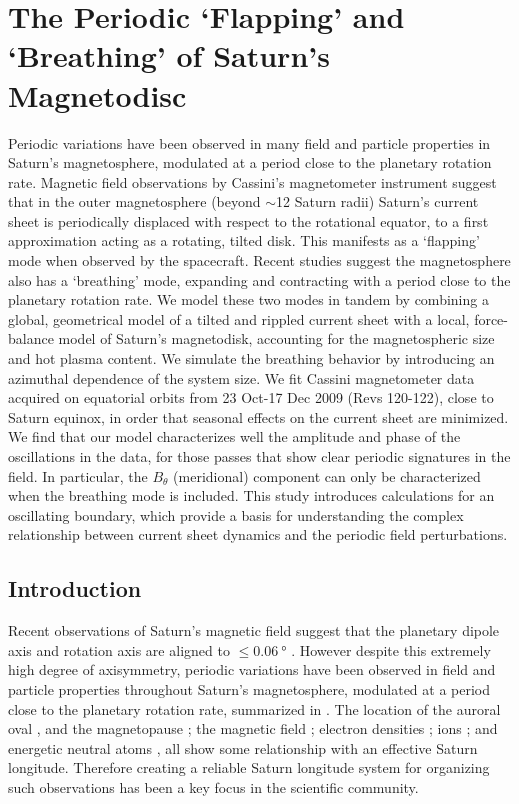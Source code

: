 \chapter[The Periodic Flapping and Breathing of Saturn's Magnetodisc]{The Periodic `Flapping' and `Breathing' of Saturn's Magnetodisc}
\label{chap:equinox}

Periodic variations have been observed in many field and particle properties in Saturn's magnetosphere, modulated at a period close to the planetary rotation rate. Magnetic field observations by Cassini's magnetometer instrument suggest that in the outer magnetosphere (beyond ${\sim}$12 Saturn radii) Saturn's current sheet is periodically displaced with respect to the rotational equator, to a first approximation acting as a rotating, tilted disk. This manifests as a `flapping' mode when observed by the spacecraft. Recent studies suggest the magnetosphere also has a `breathing' mode, expanding and contracting with a period close to the planetary rotation rate. We model these two modes in tandem by combining a global, geometrical model of a tilted and rippled current sheet with a local, force-balance model of Saturn's magnetodisk, accounting for the magnetospheric size and hot plasma content. We simulate the breathing behavior by introducing an azimuthal dependence of the system size. We fit Cassini magnetometer data acquired on equatorial orbits from 23 Oct{\--}17 Dec 2009 (Revs 120{\--}122), close to Saturn equinox, in order that seasonal effects on the current sheet are minimized. We find that our model characterizes well the amplitude and phase of the oscillations in the data, for those passes that show clear periodic signatures in the field. In particular, the $B_\theta$ (meridional) component can only be characterized when the breathing mode is included. This study introduces calculations for an oscillating boundary, which provide a basis for understanding the complex relationship between current sheet dynamics and the periodic field perturbations.

\section{Introduction}\label{equinox:sec:intro}
Recent observations of Saturn's magnetic field suggest that the planetary dipole axis and rotation axis are aligned to $\leq\SI{0.06}{\degree}$ \citep{cao2011}. However despite this extremely high degree of axisymmetry, periodic variations have been observed in field and particle properties throughout Saturn's magnetosphere, modulated at a period close to the planetary rotation rate, summarized in \citet{carbary2013}. The location of the auroral oval \citep{provan2009b}, and the magnetopause \citep{clarke2010}; the magnetic field \citep{espinosa2000, andrews2008}; electron densities \citep{morooka2009}; ions \citep{burch2009, nemeth2011, szego2011}; and energetic neutral atoms \citep{paranicas2005}, all show some relationship with an effective Saturn longitude. Therefore creating a reliable Saturn longitude system for organizing such observations has been a key focus in the scientific community.

